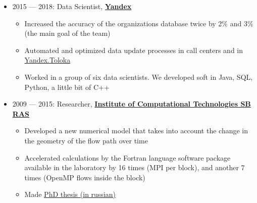 \documentclass[11pt]{article}
\begin{document}
\begin{itemize}
  \item 2015 — 2018:
	Data Scientist, \textbf{\href{https://yandex.ru/}{Yandex}}
	\begin{itemize}
		\item Increased the accuracy of the organizations database twice by 2\% and 3\% (the main goal of the team)
		\item Automated and optimized data update processes in call centers and in \href{https://toloka.yandex.ru}{Yandex.Toloka}
		\item Worked in a group of six data scientists. We developed soft in Java, SQL, Python, a little bit of C++
	\end{itemize}

  \item 2009 — 2015:
	Researcher, \textbf{\href{http://www.ict.nsc.ru}{Institute of Computational Technologies SB RAS}}
	\begin{itemize}
		\item Developed a new numerical model that takes into account the change in the geometry of the flow path over time
		\item Accelerated calculations by the Fortran language software package available in the laboratory by 16 times (MPI per block), and another 7 times (OpenMP flows inside the block)
		\item Made \href{https://github.com/avalur/dissertation/blob/master/to_print/autoref_Avdyushenko.pdf}{PhD thesis (in russian)}
	\end{itemize}

\end{itemize}
\end{document}
